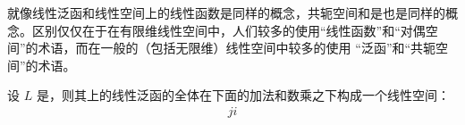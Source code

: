 
就像线性泛函和线性空间上的线性函数是同样的概念，共轭空间和是也是同样的概念。区别仅仅在于在有限维线性空间中，人们较多的使用“线性函数”和“对偶空间”的术语，而在一般的（包括无限维）线性空间中较多的使用 “泛函”和“共轭空间”的术语。

\begin{lemma}
设 $L$ 是，则其上的线性泛函的全体在下面的加法和数乘之下构成一个线性空间：
\begin{equation}
\begin{aligned}
ji
\end{aligned}
\end{equation}
\end{lemma}

\begin{definition}{}

\end{definition}
